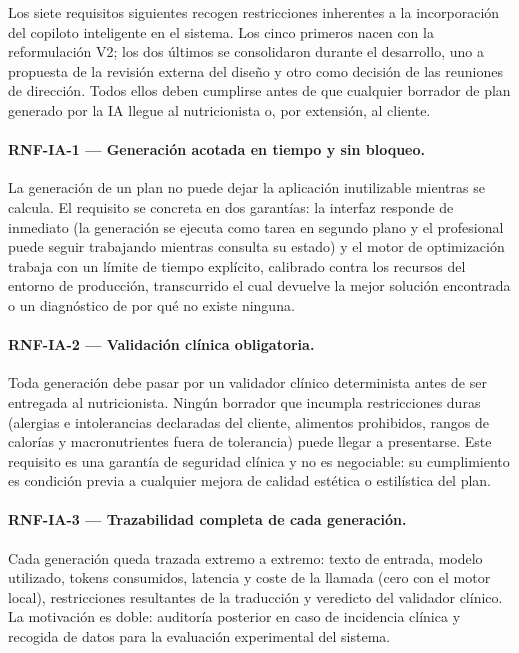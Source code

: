Los siete requisitos siguientes recogen restricciones inherentes a la incorporación del copiloto inteligente en el sistema. Los cinco primeros nacen con la reformulación V2; los dos últimos se consolidaron durante el desarrollo, uno a propuesta de la revisión externa del diseño y otro como decisión de las reuniones de dirección. Todos ellos deben cumplirse antes de que cualquier borrador de plan generado por la IA llegue al nutricionista o, por extensión, al cliente.

\paragraph{RNF-IA-1 --- Generación acotada en tiempo y sin bloqueo.}
La generación de un plan no puede dejar la aplicación inutilizable mientras se calcula. El requisito se concreta en dos garantías: la interfaz responde de inmediato (la generación se ejecuta como tarea en segundo plano y el profesional puede seguir trabajando mientras consulta su estado) y el motor de optimización trabaja con un límite de tiempo explícito, calibrado contra los recursos del entorno de producción, transcurrido el cual devuelve la mejor solución encontrada o un diagnóstico de por qué no existe ninguna.

\paragraph{RNF-IA-2 --- Validación clínica obligatoria.}
Toda generación debe pasar por un validador clínico determinista antes de ser entregada al nutricionista. Ningún borrador que incumpla restricciones duras (alergias e intolerancias declaradas del cliente, alimentos prohibidos, rangos de calorías y macronutrientes fuera de tolerancia) puede llegar a presentarse. Este requisito es una garantía de seguridad clínica y no es negociable: su cumplimiento es condición previa a cualquier mejora de calidad estética o estilística del plan.

\paragraph{RNF-IA-3 --- Trazabilidad completa de cada generación.}
Cada generación queda trazada extremo a extremo: texto de entrada, modelo utilizado, tokens consumidos, latencia y coste de la llamada (cero con el motor local), restricciones resultantes de la traducción y veredicto del validador clínico. La motivación es doble: auditoría posterior en caso de incidencia clínica y recogida de datos para la evaluación experimental del sistema.

